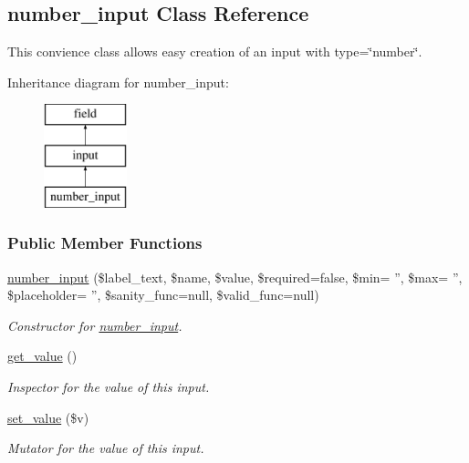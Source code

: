 \hypertarget{classnumber__input}{\subsection{number\-\_\-input Class Reference}
\label{classnumber__input}
}


This convience class allows easy creation of an input with type=\char`\"{}number\char`\"{}.  


Inheritance diagram for number\-\_\-input\-:\begin{figure}[H]
\begin{center}
\leavevmode
\includegraphics[height=3.000000cm]{classnumber__input}
\end{center}
\end{figure}
\subsubsection*{Public Member Functions}
\begin{DoxyCompactItemize}
\item 
\hyperlink{classnumber__input_a9d23bb31aa8b5bdd4ff7aa5cb2220235}{number\-\_\-input} (\$label\-\_\-text, \$name, \$value, \$required=false, \$min= '', \$max= '', \$placeholder= '', \$sanity\-\_\-func=null, \$valid\-\_\-func=null)
\begin{DoxyCompactList}\small\item\em Constructor for \hyperlink{classnumber__input}{number\-\_\-input}. \end{DoxyCompactList}\item 
\hyperlink{classnumber__input_ac3cbe1ec02ef79588e1dbf5d2360b84e}{get\-\_\-value} ()
\begin{DoxyCompactList}\small\item\em Inspector for the value of this input. \end{DoxyCompactList}\item 
\hyperlink{classnumber__input_a8026b12c0bf4c8ea0ad303a532ed7230}{set\-\_\-value} (\$v)
\begin{DoxyCompactList}\small\item\em Mutator for the value of this input. \end{DoxyCompactList}\end{DoxyCompactItemize}
